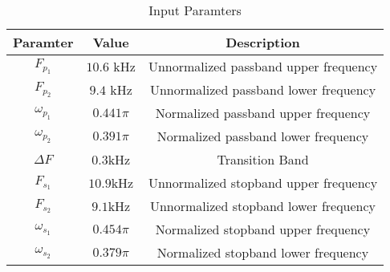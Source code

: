 \begin{table}[!h]
    \centering
    \begin{tabular}{|c|c|c|}
      \hline
      \textbf{Paramter}   & \textbf{Value} & \textbf{Description}\\
      \hline
       $F_{p_1}$  & $10.6$ kHz & Unnormalized passband upper frequency\\
       \hline
        $F_{p_2}$  & $9.4$ kHz & Unnormalized passband lower frequency\\
        \hline
        $\omega_{p_1}$ & $0.441\pi$ & Normalized passband upper frequency\\
        \hline
        $\omega_{p_2}$ & $0.391\pi$ & Normalized passband lower frequency\\
        \hline
        $\Delta F$ & $0.3$kHz & Transition Band\\
        \hline
        $F_{s_1}$ & $10.9$kHz & Unnormalized stopband upper frequency\\
        \hline
        $F_{s_2}$ & $9.1$kHz & Unnormalized stopband lower frequency\\
        \hline
        $\omega_{s_1}$ & $0.454\pi$ & Normalized stopband upper frequency\\
        \hline
        $\omega_{s_2}$ & $0.379\pi$ & Normalized stopband lower frequency\\
    \hline
    \end{tabular}
    \caption{Input Paramters}
    \label{tab:parameters}
\end{table}
